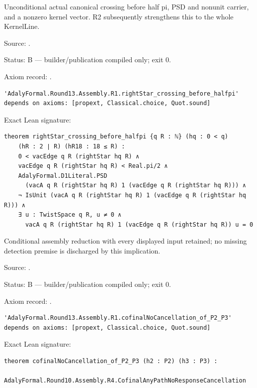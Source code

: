 \begin{theorem}[bp-550]
\label{bp-550}
\leanok
Unconditional actual canonical crossing before half pi, PSD and nonunit carrier, and a nonzero kernel vector. R2 subsequently strengthens this to the whole KernelLine.

\par Source: \texttt{}.
\par Status: B — builder/publication compiled only; exit 0.
\par Axiom record: \texttt{}.
\begin{verbatim}
'AdalyFormal.Round13.Assembly.R1.rightStar_crossing_before_halfpi' depends on axioms: [propext, Classical.choice, Quot.sound]
\end{verbatim}
\par Exact Lean signature:
\begin{verbatim}
theorem rightStar_crossing_before_halfpi {q R : ℕ} (hq : 0 < q)
    (hR : 2 ∣ R) (hR18 : 18 ≤ R) :
    0 < vacEdge q R (rightStar hq R) ∧
    vacEdge q R (rightStar hq R) < Real.pi/2 ∧
    AdalyFormal.D1Literal.PSD
      (vacA q R (rightStar hq R) 1 (vacEdge q R (rightStar hq R))) ∧
    ¬ IsUnit (vacA q R (rightStar hq R) 1 (vacEdge q R (rightStar hq R))) ∧
    ∃ u : TwistSpace q R, u ≠ 0 ∧
      vacA q R (rightStar hq R) 1 (vacEdge q R (rightStar hq R)) u = 0
\end{verbatim}
\end{theorem}

\begin{theorem}[bp-551]
\label{bp-551}
\leanok
Conditional assembly reduction with every displayed input retained; no missing detection premise is discharged by this implication.

\par Source: \texttt{}.
\par Status: B — builder/publication compiled only; exit 0.
\par Axiom record: \texttt{}.
\begin{verbatim}
'AdalyFormal.Round13.Assembly.R1.cofinalNoCancellation_of_P2_P3' depends on axioms: [propext, Classical.choice, Quot.sound]
\end{verbatim}
\par Exact Lean signature:
\begin{verbatim}
theorem cofinalNoCancellation_of_P2_P3 (h2 : P2) (h3 : P3) :
    AdalyFormal.Round10.Assembly.R4.CofinalAnyPathNoResponseCancellation
\end{verbatim}
\end{theorem}

